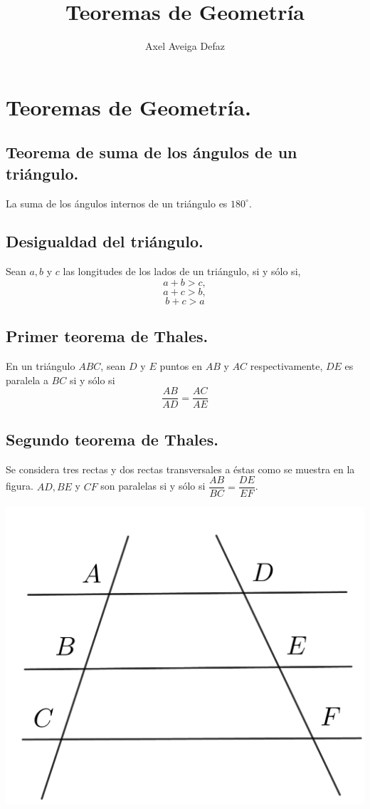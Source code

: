 \documentclass[12pt,a4paper,oneside]{book}
\author{Axel Aveiga Defaz}
\title{Teoremas de Geometría}
\begin{document}
\maketitle

\setlength{\parindent}{0 pt}
\renewcommand{\headrulewidth}{0.5pt}
\cfoot{}

\tableofcontents
\let\cleardoublepage\clearpage

\chapter{Teoremas de Geometría.}
\section{Teorema de suma de los ángulos de un triángulo.} 
La suma de los ángulos internos de un triángulo es $180^\circ$.
\section{Desigualdad del triángulo.}
Sean $a, b$ y $c$ las longitudes de los lados de un triángulo, si y sólo si, 
$$a+b>c,$$ 
$$a+c>b,$$ 
$$b+c>a$$
\section{Primer teorema de Thales.}
En un triángulo $ABC$, sean $D$ y $E$ puntos en $AB$
y $AC$ respectivamente, $DE$ es paralela a $BC$ si y sólo si $$\dfrac{AB}{AD}=\dfrac{AC}{AE}$$
\section{Segundo teorema de Thales.}
Se considera tres rectas y dos rectas transversales a éstas como se muestra en la figura. $AD, BE$ y $CF$ son paralelas si y sólo si $\dfrac{AB}{BC}=\dfrac{DE}{EF}$.
\begin{center}
\includegraphics[scale=0.45]{Imagenes/thales.png}
\end{center}
\newpage
\end{document}
